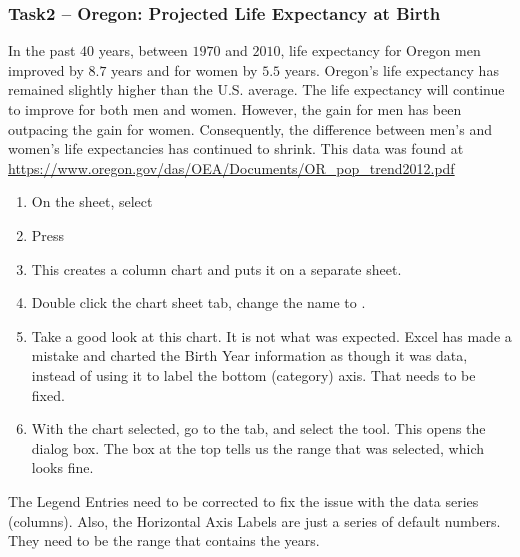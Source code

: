 \subsubsection{Task2 – Oregon: Projected Life Expectancy at Birth}

In the past $ 40 $ years, between $ 1970 $ and $ 2010 $, life expectancy for Oregon men improved by $ 8.7 $ years and for women by $ 5.5 $ years. Oregon's life expectancy has remained slightly higher than the U.S. average. The life expectancy will continue to improve for both men and women. However, the gain for men has been outpacing the gain for women. Consequently, the difference between men's and women's life expectancies has continued to shrink. This data was found at \url{https://www.oregon.gov/das/OEA/Documents/OR_pop_trend2012.pdf}

\begin{enumerate}
	\item On the  sheet, select 
	\item Press 
	\item This creates a column chart and puts it on a separate sheet.
	\item Double click the chart sheet tab, change the name to .
	\item Take a good look at this chart. It is not what was expected. Excel has made a mistake and charted the Birth Year information as though it was data, instead of using it to label the bottom (category) axis. That needs to be fixed.
	\item With the chart selected, go to the  tab, and select the  tool. This opens the  dialog box. The box at the top tells us the range that was selected, which looks fine. 
\end{enumerate}
	
The Legend Entries need to be corrected to fix the issue with the data series (columns). Also, the Horizontal Axis Labels are just a series of default numbers. They need to be the range that contains the years.

